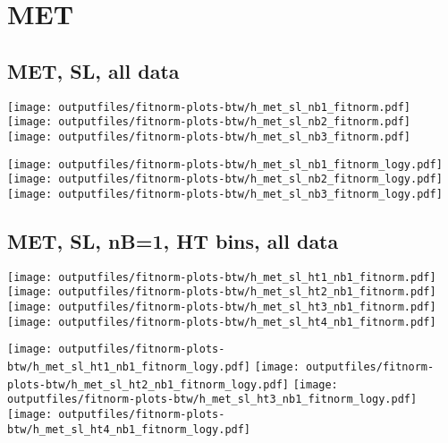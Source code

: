 \documentclass[11pt]{article}
\begin{document}
  \pagebreak
  \clearpage
  \tableofcontents
  \clearpage





    \section{MET}
     \subsection{ MET, SL, all data}

    \noindent
     \texttt{[image: outputfiles/fitnorm-plots-btw/h\_met\_sl\_nb1\_fitnorm.pdf]}
     \texttt{[image: outputfiles/fitnorm-plots-btw/h\_met\_sl\_nb2\_fitnorm.pdf]}
     \texttt{[image: outputfiles/fitnorm-plots-btw/h\_met\_sl\_nb3\_fitnorm.pdf]}

    \noindent
     \texttt{[image: outputfiles/fitnorm-plots-btw/h\_met\_sl\_nb1\_fitnorm\_logy.pdf]}
     \texttt{[image: outputfiles/fitnorm-plots-btw/h\_met\_sl\_nb2\_fitnorm\_logy.pdf]}
     \texttt{[image: outputfiles/fitnorm-plots-btw/h\_met\_sl\_nb3\_fitnorm\_logy.pdf]}


     \subsection{ MET, SL, nB=1, HT bins, all data}


    \noindent
     \texttt{[image: outputfiles/fitnorm-plots-btw/h\_met\_sl\_ht1\_nb1\_fitnorm.pdf]}
     \texttt{[image: outputfiles/fitnorm-plots-btw/h\_met\_sl\_ht2\_nb1\_fitnorm.pdf]}
     \texttt{[image: outputfiles/fitnorm-plots-btw/h\_met\_sl\_ht3\_nb1\_fitnorm.pdf]}
     \texttt{[image: outputfiles/fitnorm-plots-btw/h\_met\_sl\_ht4\_nb1\_fitnorm.pdf]}

    \noindent
     \texttt{[image: outputfiles/fitnorm-plots-btw/h\_met\_sl\_ht1\_nb1\_fitnorm\_logy.pdf]}
     \texttt{[image: outputfiles/fitnorm-plots-btw/h\_met\_sl\_ht2\_nb1\_fitnorm\_logy.pdf]}
     \texttt{[image: outputfiles/fitnorm-plots-btw/h\_met\_sl\_ht3\_nb1\_fitnorm\_logy.pdf]}
     \texttt{[image: outputfiles/fitnorm-plots-btw/h\_met\_sl\_ht4\_nb1\_fitnorm\_logy.pdf]}
\end{document}
